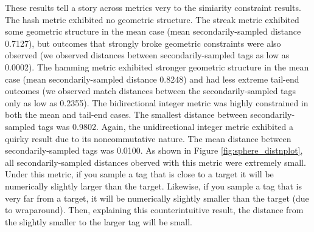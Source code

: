 These results tell a story across metrics very to the simiarity constraint results.
The hash metric exhibited no geometric structure.
The streak metric exhibited some geometric structure in the mean case (mean secondarily-sampled distance 0.7127), but outcomes that strongly broke geometric constraints were also observed (we observed distances between secondarily-sampled tags as low as 0.0002).
The hamming metric exhibited stronger geometric structure in the mean case (mean secondarily-sampled distance 0.8248) and had less extreme tail-end outcomes (we observed match distances between the secondarily-sampled tags only as low as 0.2355).
The bidirectional integer metric was highly constrained in both the mean and tail-end cases.
The smallest distance between secondarily-sampled tags was 0.9802.
Again, the unidirectional integer metric exhibited a quirky result due to its noncommutative nature.
The mean distance between secondarily-sampled tags was 0.0100.
As shown in Figure \ref{fig:sphere_distnplot}, all secondarily-sampled distances oberved with this metric were extremely small.
Under this metric, if you sample a tag that is close to a target it will be numerically slightly larger than the target.
Likewise, if you sample a tag that is very far from a target, it will be numerically slightly smaller than the target (due to wraparound).
Then, explaining this counterintuitive result, the distance from the slightly smaller to the larger tag will be small.
